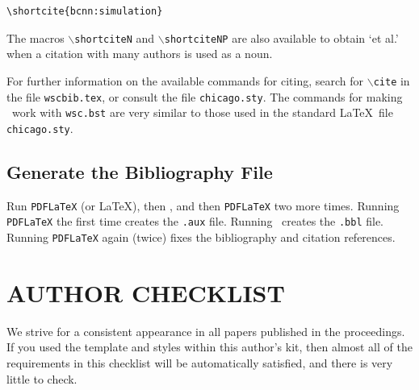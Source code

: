 \documentclass{wscpaperproc}
\theoremstyle{wsc}
\begin{document}
\begin{verbatim}
\shortcite{bcnn:simulation}
\end{verbatim}\vspace{5mm}

\noindent The macros {\tt $\backslash$shortciteN} and {\tt $\backslash$shortciteNP} are also available to obtain `et al.' when a citation with many authors is used as a noun.

For further information on the available commands for citing, search for {\tt $\backslash$cite} in the file {\tt wscbib.tex}, or consult the file {\tt chicago.sty}. The commands for making \BibTeX\ work with {\tt wsc.bst} are very similar to those used in the standard \LaTeX\ file {\tt chicago.sty}.

\subsection{Generate the Bibliography File}

Run {\tt PDFLaTeX} (or \LaTeX), then \BibTeX, and then {\tt PDFLaTeX} two more times. Running {\tt PDFLaTeX} the first time creates the \texttt{.aux} file. Running \BibTeX\ creates the {\tt .bbl} file.  Running {\tt PDFLaTeX} again (twice) fixes the bibliography and citation references.


\section{AUTHOR CHECKLIST}
We strive for a consistent appearance in all papers published in the proceedings. If you used the template and styles within this author's kit, then almost all of the requirements in this checklist will be automatically satisfied, and there is very little to check.
\end{document}
